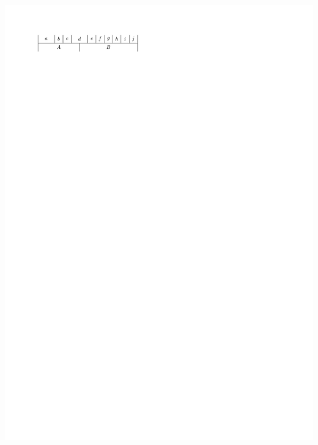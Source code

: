 \documentclass[a4paper]{article}
\begin{document}
\clearpage%
\includegraphics[width=\textwidth]{./introduction/img/2sidedBefore.pdf}
\clearpage%
\end{document}
